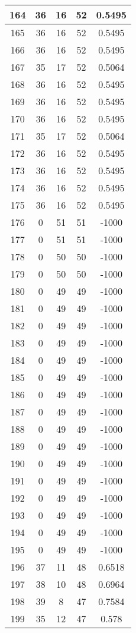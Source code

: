 \documentclass[letterpaper, 12pt]{article}
\begin{document}
\begin{longtable}{|c|c|c|c|c|}
\hline
164 & 36 & 16 & 52 & 0.5495 \\
\hline
165 & 36 & 16 & 52 & 0.5495 \\
\hline
166 & 36 & 16 & 52 & 0.5495 \\
\hline
167 & 35 & 17 & 52 & 0.5064 \\
\hline
168 & 36 & 16 & 52 & 0.5495 \\
\hline
169 & 36 & 16 & 52 & 0.5495 \\
\hline
170 & 36 & 16 & 52 & 0.5495 \\
\hline
171 & 35 & 17 & 52 & 0.5064 \\
\hline
172 & 36 & 16 & 52 & 0.5495 \\
\hline
173 & 36 & 16 & 52 & 0.5495 \\
\hline
174 & 36 & 16 & 52 & 0.5495 \\
\hline
175 & 36 & 16 & 52 & 0.5495 \\
\hline
176 & 0 & 51 & 51 & -1000 \\
\hline
177 & 0 & 51 & 51 & -1000 \\
\hline
178 & 0 & 50 & 50 & -1000 \\
\hline
179 & 0 & 50 & 50 & -1000 \\
\hline
180 & 0 & 49 & 49 & -1000 \\
\hline
181 & 0 & 49 & 49 & -1000 \\
\hline
182 & 0 & 49 & 49 & -1000 \\
\hline
183 & 0 & 49 & 49 & -1000 \\
\hline
184 & 0 & 49 & 49 & -1000 \\
\hline
185 & 0 & 49 & 49 & -1000 \\
\hline
186 & 0 & 49 & 49 & -1000 \\
\hline
187 & 0 & 49 & 49 & -1000 \\
\hline
188 & 0 & 49 & 49 & -1000 \\
\hline
189 & 0 & 49 & 49 & -1000 \\
\hline
190 & 0 & 49 & 49 & -1000 \\
\hline
191 & 0 & 49 & 49 & -1000 \\
\hline
192 & 0 & 49 & 49 & -1000 \\
\hline
193 & 0 & 49 & 49 & -1000 \\
\hline
194 & 0 & 49 & 49 & -1000 \\
\hline
195 & 0 & 49 & 49 & -1000 \\
\hline
196 & 37 & 11 & 48 & 0.6518 \\
\hline
197 & 38 & 10 & 48 & 0.6964 \\
\hline
198 & 39 & 8 & 47 & 0.7584 \\
\hline
199 & 35 & 12 & 47 & 0.578 \\
\hline
\end{longtable}
\end{document}
